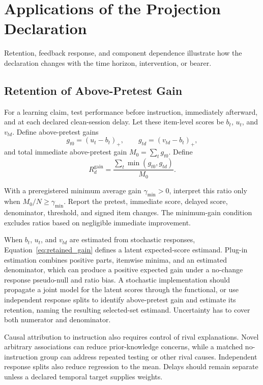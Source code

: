 \documentclass[12pt]{article}
\begin{document}
\section{Applications of the Projection Declaration}\label{sec:protocols}

Retention, feedback response, and component dependence illustrate how the declaration changes with the time horizon, intervention, or bearer.

\subsection{Retention of Above-Pretest Gain}\label{ssec:retention}

For a learning claim, test performance before instruction, immediately afterward, and at each declared clean-session delay. Let these item-level scores be \(b_t\), \(u_t\), and \(v_{td}\). Define above-pretest gains
\[
g_{t0}=(u_t-b_t)_+,
\qquad
g_{td}=(v_{td}-b_t)_+,
\]
and total immediate above-pretest gain \(M_0=\sum_tg_{t0}\). Define
\begin{equation}\label{eq:retained_gain}
R^{\mathrm{gain}}_d
=\frac{\sum_t\min(g_{t0},g_{td})}{M_0}.
\end{equation}

With a preregistered minimum average gain \(\gamma_{\min}>0\), interpret this ratio only when \(M_0/N\geq\gamma_{\min}\). Report the pretest, immediate score, delayed score, denominator, threshold, and signed item changes. The minimum-gain condition excludes ratios based on negligible immediate improvement.

When \(b_t\), \(u_t\), and \(v_{td}\) are estimated from stochastic responses, Equation~\ref{eq:retained_gain} defines a latent expected-score estimand. Plug-in estimation combines positive parts, itemwise minima, and an estimated denominator, which can produce a positive expected gain under a no-change response pseudo-null and ratio bias. A stochastic implementation should propagate a joint model for the latent scores through the functional, or use independent response splits to identify above-pretest gain and estimate its retention, naming the resulting selected-set estimand. Uncertainty has to cover both numerator and denominator.

Causal attribution to instruction also requires control of rival explanations. Novel arbitrary associations can reduce prior-knowledge concerns, while a matched no-instruction group can address repeated testing or other rival causes. Independent response splits also reduce regression to the mean. Delays should remain separate unless a declared temporal target supplies weights.
\end{document}
